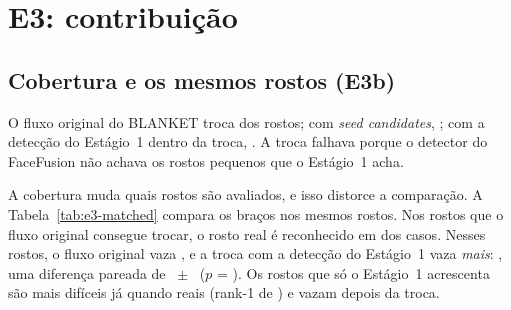\begin{table}[ht]\centering
\caption{E2: cobertura e FaceNet rank-1 nas três visões, rank-1 por aluno, redução relativa e verificação no vídeo final.}
\label{tab:e2-main}
\small
\resizebox{\linewidth}{!}{}
\fonteautor
\end{table}

\begin{table}[ht]\centering
\caption{E2: utilidade nos rostos gerados e piso de ruído.}
\label{tab:e2-utility}

\fonteautor
\end{table}

\begin{table}[ht]\centering
\caption{E2: FaceNet rank-1 nos rostos gerados, por tamanho do rosto.}
\label{tab:r-e2-size}

\fonteautor
\end{table}

\section{E3: contribuição}

\subsection{Cobertura e os mesmos rostos (E3b)}
\label{sec:r-mesmos-rostos}

O fluxo original do BLANKET troca  dos rostos; com \emph{seed candidates}, ; com a detecção do Estágio~1 dentro da troca, . A troca falhava porque o detector do FaceFusion não achava os rostos pequenos que o Estágio~1 acha.

A cobertura muda quais rostos são avaliados, e isso distorce a comparação. A Tabela~\ref{tab:e3-matched} compara os braços nos mesmos rostos. Nos  rostos que o fluxo original consegue trocar, o rosto real é reconhecido em  dos casos. Nesses rostos, o fluxo original vaza , e a troca com a detecção do Estágio~1 vaza \emph{mais}: , uma diferença pareada de ~$\pm$~ ($p$ = ). Os  rostos que só o Estágio~1 acrescenta são mais difíceis já quando reais (rank-1 de ) e vazam  depois da troca.

